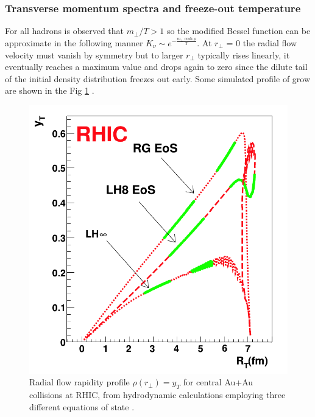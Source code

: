 \documentclass[12pt,a4paper]{book}
\begin{document}
	
	\subsubsection{Transverse momentum spectra and freeze-out temperature}
	For all hadrons is observed that $m_\perp/T >1$ so the modified Bessel function can be approximate in the following manner $K_\nu \sim e^{- \frac{m_\perp \cosh \rho}{T}}$.  At $r_\perp$ = 0 the radial flow velocity must vanish by symmetry but to larger $r_\perp$ typically rises linearly, it eventually reaches a maximum value and drops again to zero since the dilute tail of the initial density distribution freezes out early. Some simulated profile of grow are shown in the Fig \ref{fig:radial_flow} \cite{teaney2001hydrodynamicdescriptionheavyion}.
	
	\begin{figure}[ht]
		\centering
		\includegraphics[width=0.6\linewidth]{pictures/radial_flow.png}
		\caption{Radial flow rapidity profile $\rho(r_\perp)= y_T$ for central Au+Au collisions at RHIC, from hydrodynamic calculations employing three different equations of state \cite{EvolutionofcollisionsandQGP}.}
		\label{fig:radial_flow} 
	\end{figure}
	
\end{document}
